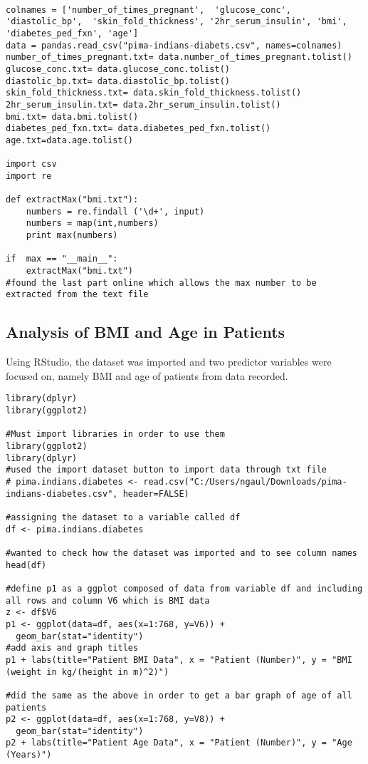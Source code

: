 \documentclass [letterpaper]{article}
\begin{document}
\begin{lstlisting}

colnames = ['number_of_times_pregnant',  'glucose_conc',  'diastolic_bp',  'skin_fold_thickness', '2hr_serum_insulin', 'bmi', 'diabetes_ped_fxn', 'age']
data = pandas.read_csv("pima-indians-diabets.csv", names=colnames)
number_of_times_pregnant.txt= data.number_of_times_pregnant.tolist()
glucose_conc.txt= data.glucose_conc.tolist()
diastolic_bp.txt= data.diastolic_bp.tolist()
skin_fold_thickness.txt= data.skin_fold_thickness.tolist()
2hr_serum_insulin.txt= data.2hr_serum_insulin.tolist()
bmi.txt= data.bmi.tolist()
diabetes_ped_fxn.txt= data.diabetes_ped_fxn.tolist()
age.txt=data.age.tolist()

import csv
import re

def extractMax("bmi.txt"):
	numbers = re.findall ('\d+', input)
	numbers = map(int,numbers)
	print max(numbers)

if	max == "__main__":
	extractMax("bmi.txt")
#found the last part online which allows the max number to be extracted from the text file

\end{lstlisting}

\subsection{Analysis of BMI and Age in Patients}

Using RStudio, the dataset was imported and two predictor variables were focused on, namely BMI and age of patients from data recorded.

\lstset{language=R}
\begin{lstlisting}[frame=single]   
library(dplyr)
library(ggplot2)

#Must import libraries in order to use them
library(ggplot2)
library(dplyr)
#used the import dataset button to import data through txt file
# pima.indians.diabetes <- read.csv("C:/Users/ngaul/Downloads/pima-indians-diabetes.csv", header=FALSE)

#assigning the dataset to a variable called df
df <- pima.indians.diabetes

#wanted to check how the dataset was imported and to see column names
head(df)

#define p1 as a ggplot composed of data from variable df and including all rows and column V6 which is BMI data
z <- df$V6
p1 <- ggplot(data=df, aes(x=1:768, y=V6)) +
  geom_bar(stat="identity")
#add axis and graph titles
p1 + labs(title="Patient BMI Data", x = "Patient (Number)", y = "BMI (weight in kg/(height in m)^2)")

#did the same as the above in order to get a bar graph of age of all patients
p2 <- ggplot(data=df, aes(x=1:768, y=V8)) +
  geom_bar(stat="identity")
p2 + labs(title="Patient Age Data", x = "Patient (Number)", y = "Age (Years)")
\end{lstlisting}
\end{document}
